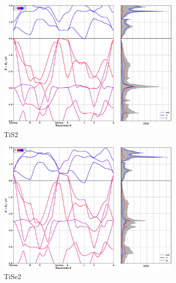 \begin{figure}[H]
\centering
	\begin{subfigure}[b]{.9\textwidth}
    	\includegraphics[width=\linewidth]{img/results/TiS2_SCAN_relaxed_BAND+DOS.eps}
    	\caption{TiS2}
	\end{subfigure}
	\begin{subfigure}[b]{.4\textwidth}
    	\includegraphics[width=\linewidth]{img/results/TiSe2_SCAN_relaxed_BAND+DOS}
    	\caption{
    	TiSe2}
	\end{subfigure}
	\begin{subfigure}[b]{.4\textwidth}

\end{subfigure}
\end{figure}
